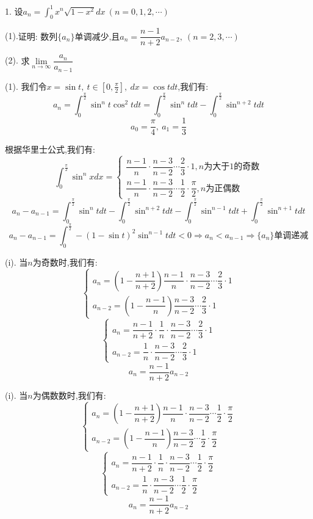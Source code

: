 1. 设$a_{n}=\int_{0}^{1}x^{n}\sqrt{1-x^2}dx\ (n=0,1,2,\cdots)$

(1).$\text{证明: 数列}\{a_{n}\}\text{单调减少,且}a_{n}=\dfrac{n-1}{n+2}a_{n-2},\ (n=2,3,\cdots)$

(2). $\text{求}\lim\limits_{n\rightarrow \infty}\dfrac{a_{n}}{a_{n-1}}$
\begin{solution}
	
	(1).
	我们令$x=\sin t,\ t\in[0,\frac{\pi}{2}],\ dx=\cos tdt$,我们有: 
	$$a_{n}=\int_{0}^{\frac{\pi}{2}}\sin^{n}t\cos^{2} tdt=\int_{0}^{\frac{\pi}{2}}\sin^{n}tdt-\int_{0}^{\frac{\pi}{2}}\sin^{n+2}tdt$$
	$$a_{0}=\frac{\pi}{4},\ a_{1}=\frac{1}{3}$$
	
	根据华里士公式,我们有: 
	$$\int_{0}^{\frac{\pi}{2}}\sin^{n}xdx=\left\lbrace 
	\begin{array}{l}
		\dfrac{n-1}{n}\cdot\dfrac{n-3}{n-2}\cdots\dfrac{2}{3}\cdot 1,n\text{为大于1的奇数}\\
		\dfrac{n-1}{n}\cdot\dfrac{n-3}{n-2}\cdots\dfrac{1}{2}\cdot\dfrac{\pi}{2},n\text{为正偶数}
	\end{array}
	\right. $$
	$$a_{n}-a_{n-1}=\int_{0}^{\frac{\pi}{2}}\sin^{n}tdt-\int_{0}^{\frac{\pi}{2}}\sin^{n+2}tdt-\int_{0}^{\frac{\pi}{2}}\sin^{n-1}tdt+\int_{0}^{\frac{\pi}{2}}\sin^{n+1}tdt$$
	$$a_{n}-a_{n-1}=\int_{0}^{\frac{\pi}{2}}-(1-\sin t)^2\sin^{n-1}tdt<0\Rightarrow a_{n}<a_{n-1}\Rightarrow \{a_{n}\}\text{单调递减}$$
	
	(i). 当$n$为奇数时,我们有: 
	$$\left\lbrace 
	\begin{array}{l}
		a_{n}=(1-\dfrac{n+1}{n+2})\dfrac{n-1}{n}\cdot\dfrac{n-3}{n-2}\cdots\dfrac{2}{3}\cdot 1\\
		a_{n-2}=(1-\dfrac{n-1}{n})\dfrac{n-3}{n-2}\cdots\dfrac{2}{3}\cdot 1
	\end{array}
	\right. $$
	$$\left\lbrace 
	\begin{array}{l}
		a_{n}=\dfrac{n-1}{n+2}\cdot\dfrac{1}{n}\cdot\dfrac{n-3}{n-2}\cdots\dfrac{2}{3}\cdot 1\\
		a_{n-2}=\dfrac{1}{n}\cdot\dfrac{n-3}{n-2}\cdots\dfrac{2}{3}\cdot 1
	\end{array}
	\right. 
	$$
	$$a_{n}=\dfrac{n-1}{n+2}a_{n-2}$$
	
	(i). 当$n$为偶数数时,我们有: 
	$$\left\lbrace 
	\begin{array}{l}
		a_{n}=(1-\dfrac{n+1}{n+2})\dfrac{n-1}{n}\cdot\dfrac{n-3}{n-2}\cdots\dfrac{1}{2}\cdot\dfrac{\pi}{2}\\
		a_{n-2}=(1-\dfrac{n-1}{n})\dfrac{n-3}{n-2}\cdots\dfrac{1}{2}\cdot\dfrac{\pi}{2}
	\end{array}
	\right. $$
	$$\left\lbrace 
	\begin{array}{l}
		a_{n}=\dfrac{n-1}{n+2}\cdot\dfrac{1}{n}\cdot\dfrac{n-3}{n-2}\cdots\dfrac{1}{2}\cdot\dfrac{\pi}{2}\\
		a_{n-2}=\dfrac{1}{n}\cdot\dfrac{n-3}{n-2}\cdots\dfrac{1}{2}\cdot\dfrac{\pi}{2}
	\end{array}
	\right. 
	$$
	$$a_{n}=\frac{n-1}{n+2}a_{n-2}$$
	

\end{solution}
